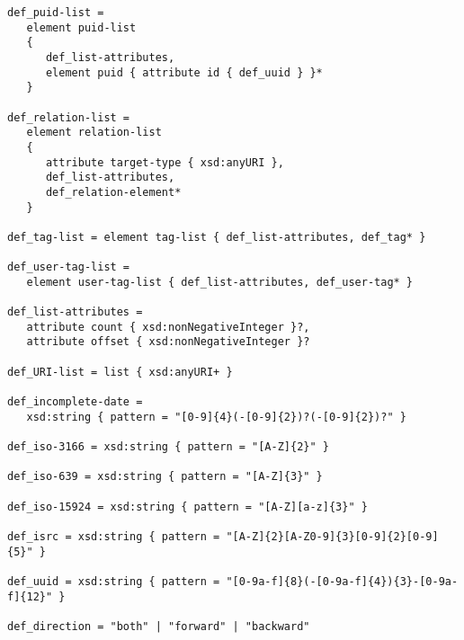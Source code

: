 \begin{Verbatim}[fontsize=\relsize{-2},frame=lines,framesep=.25in,label={[Schema Start]Schema End}]
def_puid-list =
   element puid-list
   {
      def_list-attributes,
      element puid { attribute id { def_uuid } }*
   }

def_relation-list =
   element relation-list
   {
      attribute target-type { xsd:anyURI },
      def_list-attributes,
      def_relation-element*
   }

def_tag-list = element tag-list { def_list-attributes, def_tag* }

def_user-tag-list =
   element user-tag-list { def_list-attributes, def_user-tag* }

def_list-attributes =
   attribute count { xsd:nonNegativeInteger }?,
   attribute offset { xsd:nonNegativeInteger }?

def_URI-list = list { xsd:anyURI+ }

def_incomplete-date =
   xsd:string { pattern = "[0-9]{4}(-[0-9]{2})?(-[0-9]{2})?" }

def_iso-3166 = xsd:string { pattern = "[A-Z]{2}" }

def_iso-639 = xsd:string { pattern = "[A-Z]{3}" }

def_iso-15924 = xsd:string { pattern = "[A-Z][a-z]{3}" }

def_isrc = xsd:string { pattern = "[A-Z]{2}[A-Z0-9]{3}[0-9]{2}[0-9]{5}" }

def_uuid = xsd:string { pattern = "[0-9a-f]{8}(-[0-9a-f]{4}){3}-[0-9a-f]{12}" }

def_direction = "both" | "forward" | "backward"
\end{Verbatim}

